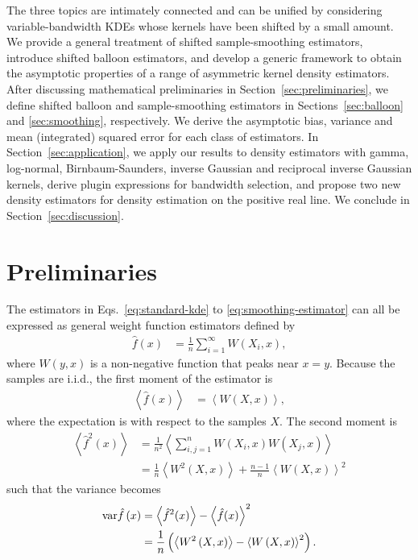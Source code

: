The three topics are intimately connected and can be unified by considering variable-bandwidth KDEs whose kernels have been shifted by a small amount. We provide a general treatment of shifted sample-smoothing estimators, introduce shifted balloon estimators, and develop a generic framework to obtain the asymptotic properties of a range of asymmetric kernel density estimators. After discussing mathematical preliminaries in Section~\ref{sec:preliminaries}, we define shifted balloon and sample-smoothing estimators in Sections~\ref{sec:balloon} and \ref{sec:smoothing}, respectively. We derive the asymptotic bias, variance and mean (integrated) squared error for each class of estimators. In Section~\ref{sec:application}, we apply our results to density estimators with gamma, log-normal, Birnbaum-Saunders, inverse Gaussian and reciprocal inverse Gaussian kernels, derive plugin expressions for bandwidth selection, and propose two new density estimators for density estimation on the positive real line. We conclude in Section~\ref{sec:discussion}.


\section{Preliminaries\label{sec:preliminaries}}

The estimators in Eqs.~\eqref{eq:standard-kde} to \eqref{eq:smoothing-estimator} can all be expressed as general weight function estimators defined by
\begin{align}
\hat{f}\left(x\right) & =\frac{1}{n}\sum_{i=1}^{\infty}W\left(X_{i},x\right),\label{eq:generalised-estimator}
\end{align}
where $W\left(y,x\right)$ is a non-negative function that peaks near $x=y$. Because the samples are i.i.d., the first moment of the estimator is
\begin{align}
\left\langle \hat{f}\left(x\right)\right\rangle  & =\left\langle W\left(X,x\right)\right\rangle ,\label{eq:generalised-mean}
\end{align}
where the expectation is with respect to the samples $X$. The second moment is
\begin{align*}
\left\langle \hat{f}^{2}\left(x\right)\right\rangle  & =\frac{1}{n^{2}}\left\langle \sum_{i,j=1}^{n}W\left(X_{i},x\right)W\left(X_{j},x\right)\right\rangle \\
 & =\frac{1}{n}\left\langle W^{2}\left(X,x\right)\right\rangle +\frac{n-1}{n}\left\langle W\left(X,x\right)\right\rangle ^{2}
\end{align*}
such that the variance becomes
\begin{align}
\var\hat{f}\left(x\right) & =\left\langle \hat{f}^{2}(x)\right\rangle -\left\langle \hat{f}(x)\right\rangle ^{2}\nonumber \\
 & =\frac{1}{n}\left(\left\langle W^{2}\left(X,x\right)\right\rangle -\left\langle W\left(X,x\right)\right\rangle ^{2}\right).\label{eq:generalised-variance}
\end{align}


